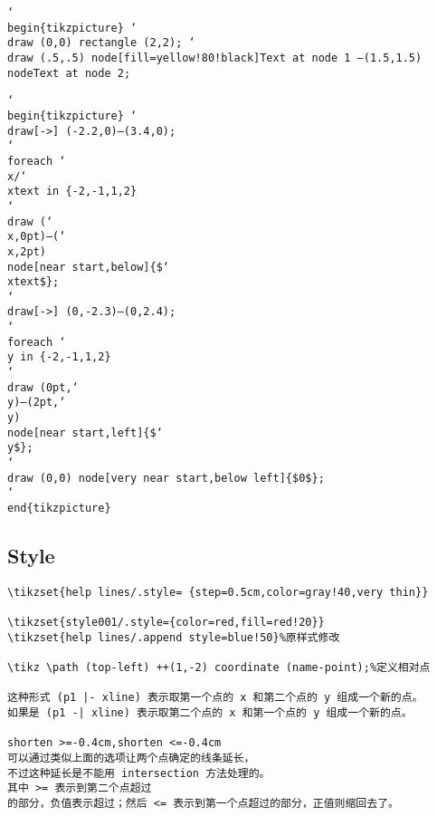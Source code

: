 \documentclass[a4paper]{article}
\newcommand\tbs[1][]{\tt\char`\\#1}
\newcommand\bpics[1]{\par\vspace{1ex}\noindent\begin{minipage}{\textwidth}\begin{minipage}{#1\textwidth}}
\newcommand\mpics[1]{\end{minipage}\begin{minipage}{#1\textwidth}\linespread{1}}
\newcommand\epics{\end{minipage}\end{minipage}\par\vspace{2ex}}
\newcommand\beginp[1]{\tbs{begin}\{#1\}}
\newcommand\pend[1]{\tbs{end}\{#1\}}
\begin{document}
      \bpics{0.3}
      \mpics{0.7}
        \beginp{tikzpicture}
          \tbs{draw} (0,0) rectangle (2,2);
          \tbs{draw} (.5,.5) node[fill=yellow!80!black]{Text at \verb|node 1|}
            \quad--(1.5,1.5) node{Text at \verb|node 2|};
      \epics

      \bpics{0.4}
      \mpics{0.6}
        \beginp{tikzpicture}
          \tbs{draw}[->] (-2.2,0)--(3.4,0);\\
          \tbs{foreach} \tbs{x}/\tbs{xtext} in \{-2,-1,1,2\} \\
            \quad\tbs{draw} (\tbs{x},0pt)--(\tbs{x},2pt) \\
            \quad node[near start,below]\{\$\tbs{xtext}\$\};\\
          \tbs{draw}[->] (0,-2.3)--(0,2.4);\\
          \tbs{foreach} \tbs{y} in \{-2,-1,1,2\}\\
            \quad\tbs{draw} (0pt,\tbs{y})--(2pt,\tbs{y})\\
            \quad node[near start,left]\{\$\tbs{y}\$\};\\
          \tbs{draw} (0,0) node[very near start,below left]\{\$0\$\};\\
        \pend{tikzpicture}
      \epics



\subsection{Style}
\begin{verbatim}
\tikzset{help lines/.style= {step=0.5cm,color=gray!40,very thin}}

\tikzset{style001/.style={color=red,fill=red!20}}
\tikzset{help lines/.append style=blue!50}%原样式修改

\tikz \path (top-left) ++(1,-2) coordinate (name-point);%定义相对点

这种形式 (p1 |- xline) 表示取第一个点的 x 和第二个点的 y 组成一个新的点。
如果是 (p1 -| xline) 表示取第二个点的 x 和第一个点的 y 组成一个新的点。

shorten >=-0.4cm,shorten <=-0.4cm
可以通过类似上面的选项让两个点确定的线条延长，
不过这种延长是不能用 intersection 方法处理的。
其中 >= 表示到第二个点超过
的部分，负值表示超过；然后 <= 表示到第一个点超过的部分，正值则缩回去了。
\end{verbatim}
\end{document}
